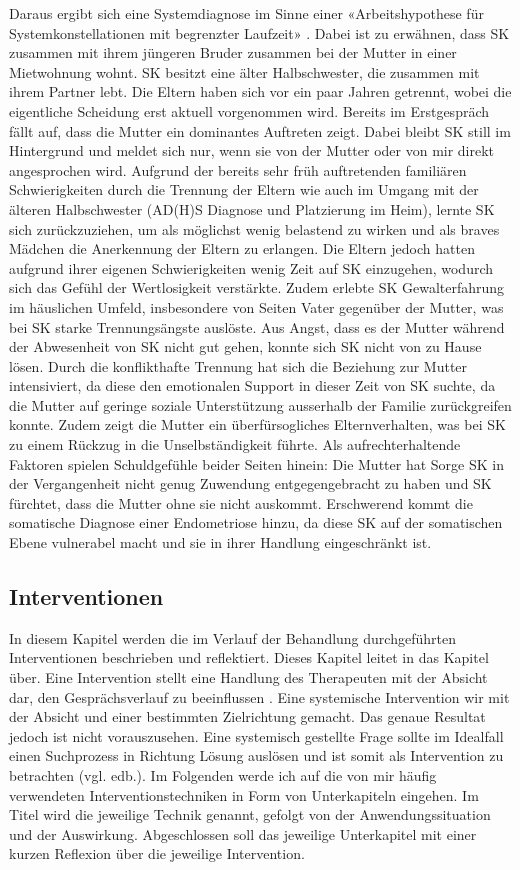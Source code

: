 Daraus ergibt sich eine Systemdiagnose im Sinne einer «Arbeitshypothese für Systemkonstellationen mit begrenzter Laufzeit» \cite{Spitzcok1999}. Dabei ist zu erwähnen, dass SK zusammen mit ihrem jüngeren Bruder zusammen bei der Mutter in einer Mietwohnung wohnt. SK besitzt eine älter Halbschwester, die zusammen mit ihrem Partner lebt. Die Eltern haben sich vor ein paar Jahren getrennt, wobei die eigentliche Scheidung erst aktuell vorgenommen wird. Bereits im Erstgespräch fällt auf, dass die Mutter ein dominantes Auftreten zeigt. Dabei bleibt SK still im Hintergrund und meldet sich nur, wenn sie von der Mutter oder von mir direkt angesprochen wird. Aufgrund der bereits sehr früh auftretenden familiären Schwierigkeiten durch die Trennung der Eltern wie auch im Umgang mit der älteren Halbschwester (AD(H)S Diagnose und Platzierung im Heim), lernte SK sich zurückzuziehen, um als möglichst wenig belastend zu wirken und als braves Mädchen die Anerkennung der Eltern zu erlangen. Die Eltern jedoch hatten aufgrund ihrer eigenen Schwierigkeiten wenig Zeit auf SK einzugehen, wodurch sich das Gefühl der Wertlosigkeit verstärkte. Zudem erlebte SK Gewalterfahrung im häuslichen Umfeld, insbesondere von Seiten Vater gegenüber der Mutter, was bei SK starke Trennungsängste auslöste. Aus Angst, dass es der Mutter während der Abwesenheit von SK nicht gut gehen, konnte sich SK nicht von zu Hause lösen. Durch die konflikthafte Trennung hat sich die Beziehung zur Mutter intensiviert, da diese den emotionalen Support in dieser Zeit von SK suchte, da die Mutter auf geringe soziale Unterstützung ausserhalb der Familie zurückgreifen konnte. Zudem zeigt die Mutter ein überfürsogliches Elternverhalten, was bei SK zu einem Rückzug in die Unselbständigkeit führte. Als aufrechterhaltende Faktoren spielen Schuldgefühle beider Seiten hinein: Die Mutter hat Sorge SK in der Vergangenheit nicht genug Zuwendung entgegengebracht zu haben und SK fürchtet, dass die Mutter ohne sie nicht auskommt. Erschwerend kommt die somatische Diagnose einer Endometriose hinzu, da diese SK auf der somatischen Ebene vulnerabel macht und sie in ihrer Handlung eingeschränkt ist. 

\subsection{Interventionen} 
In diesem Kapitel werden die im Verlauf der Behandlung durchgeführten Interventionen beschrieben und reflektiert. Dieses Kapitel leitet in das Kapitel  über. Eine Intervention stellt eine Handlung des Therapeuten mit der Absicht dar, den Gesprächsverlauf zu beeinflussen \cite{Starke2019}. Eine systemische Intervention wir mit der Absicht und einer bestimmten Zielrichtung gemacht. Das genaue Resultat jedoch ist nicht vorauszusehen. Eine systemisch gestellte Frage sollte im Idealfall einen Suchprozess in Richtung Lösung auslösen und ist somit als Intervention zu betrachten (vgl. edb.). Im Folgenden werde ich auf die von mir häufig verwendeten Interventionstechniken in Form von Unterkapiteln eingehen. Im Titel wird die jeweilige Technik genannt, gefolgt von der Anwendungssituation und der Auswirkung. Abgeschlossen soll das jeweilige Unterkapitel mit einer kurzen Reflexion über die jeweilige Intervention.

